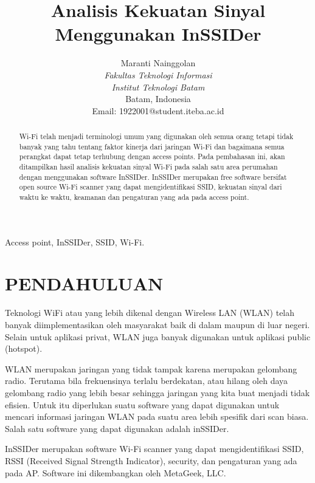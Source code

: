 \documentclass[conference]{IEEEtran}
\title{Analisis Kekuatan Sinyal Menggunakan InSSIDer}
\author{Maranti Nainggolan\\
\textit{Fakultas Teknologi Informasi}\\
\textit{Institut Teknologi Batam}\\
Batam, Indonesia\\
Email: {1922001@student.iteba.ac.id}
}
\begin{document}
\maketitle

\begin{abstract}
Wi-Fi telah menjadi terminologi umum yang digunakan oleh semua orang tetapi tidak banyak yang tahu tentang faktor kinerja dari jaringan Wi-Fi dan bagaimana semua perangkat dapat tetap terhubung dengan access points. Pada pembahasan ini, akan ditampilkan hasil analisis kekuatan sinyal Wi-Fi pada salah satu area perumahan dengan menggunakan software InSSIDer. InSSIDer merupakan free software bersifat open source Wi-Fi scanner yang dapat mengidentifikasi SSID, kekuatan sinyal dari waktu ke waktu, keamanan dan pengaturan yang ada pada access point.
\end{abstract}

\begin{IEEEkeywords}
Access point, InSSIDer, SSID, Wi-Fi.
\end{IEEEkeywords}

\section{PENDAHULUAN}
\vspace{0.1cm}

Teknologi WiFi atau yang lebih dikenal dengan Wireless LAN (WLAN) telah banyak diimplementasikan oleh masyarakat baik di dalam maupun di luar negeri. Selain untuk aplikasi privat,  WLAN juga banyak digunakan untuk aplikasi public (hotspot).

\vspace{0.2cm}

WLAN merupakan jaringan yang tidak tampak karena merupakan gelombang radio. Terutama bila frekuensinya terlalu berdekatan, atau hilang oleh daya gelombang radio yang lebih besar sehingga jaringan yang kita buat menjadi tidak efisien. Untuk itu diperlukan suatu software yang dapat digunakan untuk mencari informasi jaringan WLAN pada suatu area lebih spesifik dari scan biasa. Salah satu software yang dapat digunakan adalah inSSIDer.

\vspace{0.2cm}

InSSIDer merupakan software Wi-Fi scanner yang dapat mengidentifikasi SSID, RSSI (Received Signal Strength Indicator), security, dan pengaturan yang ada pada AP. Software ini dikembangkan oleh MetaGeek, LLC.
\end{document}
